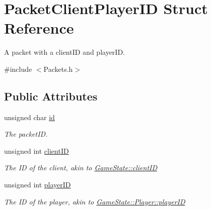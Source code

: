 \hypertarget{struct_packet_client_player_i_d}{\section{Packet\-Client\-Player\-I\-D Struct Reference}
\label{struct_packet_client_player_i_d}
}


A packet with a client\-I\-D and player\-I\-D.  




{\ttfamily \#include $<$Packets.\-h$>$}

\subsection*{Public Attributes}
\begin{DoxyCompactItemize}
\item 
\hypertarget{struct_packet_client_player_i_d_acce86d76b02d18b841377d80849d0f09}{unsigned char \hyperlink{struct_packet_client_player_i_d_acce86d76b02d18b841377d80849d0f09}{id}}\label{struct_packet_client_player_i_d_acce86d76b02d18b841377d80849d0f09}

\begin{DoxyCompactList}\small\item\em The packet\-I\-D. \end{DoxyCompactList}\item 
\hypertarget{struct_packet_client_player_i_d_a7593dcd4306947a847f926db1c214576}{unsigned int \hyperlink{struct_packet_client_player_i_d_a7593dcd4306947a847f926db1c214576}{client\-I\-D}}\label{struct_packet_client_player_i_d_a7593dcd4306947a847f926db1c214576}

\begin{DoxyCompactList}\small\item\em The I\-D of the client, akin to \hyperlink{class_game_state_ad24a423ba6655fc6541b2f12ce98e0d0}{Game\-State\-::client\-I\-D} \end{DoxyCompactList}\item 
\hypertarget{struct_packet_client_player_i_d_aba10b2aba2707dc70eb3714c900e516f}{unsigned int \hyperlink{struct_packet_client_player_i_d_aba10b2aba2707dc70eb3714c900e516f}{player\-I\-D}}\label{struct_packet_client_player_i_d_aba10b2aba2707dc70eb3714c900e516f}

\begin{DoxyCompactList}\small\item\em The I\-D of the player, akin to \hyperlink{class_game_state_1_1_player_acbd28d89e6eb8611aa66452ec31e9133}{Game\-State\-::\-Player\-::player\-I\-D} \end{DoxyCompactList}\end{DoxyCompactItemize}


